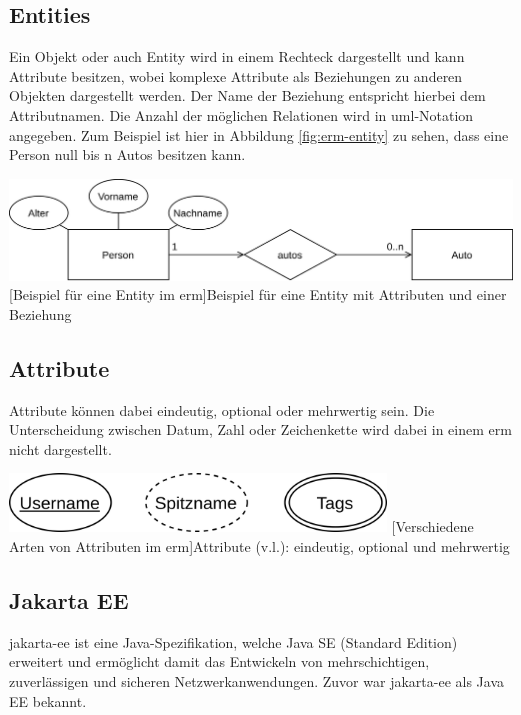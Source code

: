 \documentclass[12pt,twoside,a4paper]{article}
\begin{document}
\begin{sloppypar}
\subsection*{Entities}
Ein Objekt oder auch Entity wird in einem Rechteck dargestellt und kann Attribute besitzen, wobei komplexe Attribute als Beziehungen zu anderen Objekten dargestellt werden. Der Name der Beziehung entspricht hierbei dem Attributnamen. Die Anzahl der möglichen Relationen wird in \acrshort{uml}-Notation angegeben. Zum Beispiel ist hier in Abbildung \ref{fig:erm-entity} zu sehen, dass eine Person null bis n Autos besitzen kann.
\begin{center}
	\captionsetup{type=figure}
	\includegraphics[width=\textwidth]{images/ERM-Entity}
	[Beispiel für eine Entity im \acrshort{erm}]{Beispiel für eine Entity mit Attributen und einer Beziehung}
	\label{fig:erm-entity}
\end{center}
\subsection*{Attribute}
Attribute können dabei eindeutig, optional oder mehrwertig sein. Die Unterscheidung zwischen Datum, Zahl oder Zeichenkette wird dabei in einem \acrlong{erm} nicht dargestellt.
\begin{center}
	\captionsetup{type=figure}
	\includegraphics[width=10cm]{images/ERM-Attributes}
	[Verschiedene Arten von Attributen im \acrshort{erm}]{Attribute (v.l.): eindeutig, optional und mehrwertig}
	\label{fig:erm-attributes}
\end{center}
\subsection{Jakarta EE}\label{sec:jakarta-ee}
\acrfull{jakarta-ee} ist eine Java-Spezifikation, welche Java SE (Standard Edition) erweitert und ermöglicht damit das Entwickeln von mehrschichtigen, zuverlässigen und sicheren Netzwerkanwendungen. Zuvor war \acrshort{jakarta-ee} als Java EE bekannt.\newline\cite{java-ee}

\end{sloppypar}
\end{document}
